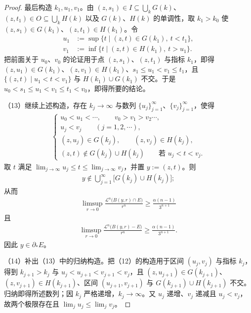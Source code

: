 \documentclass[../../main.tex]{subfiles}%
\begin{document}
\begin{proof}
最后构造 $k_1,u_1,v_1$。由 $(z,s_1)\in I\subseteq\bigcup_kG(k)$、$(z,t_1)\in O\subseteq\bigcup_kH(k)$ 以及 $G(k)$、$H(k)$ 的单调性，取 $k_1>k_0$ 使 $(z,s_1)\in G(k_1)$、$(z,t_1)\in H(k_1)$。令
\begin{align*}
u_1&:=\sup\{t\mid(z,t)\in G(k_1),\ t<t_1\},\\
v_1&:=\inf\{t\mid(z,t)\in H(k_1),\ t>u_1\}.
\end{align*}
把前面关于 $u_0$、$v_0$ 的论证用于点 $(z,s_1)$、$(z,t_1)$ 与指标 $k_1$，即得 $(z,u_1)\in G(k_1)$、$(z,v_1)\in H(k_1)$、$s_1\leqslant u_1<v_1\leqslant t_1$，且 $\{(z,t)\mid u_1<t<v_1\}$ 与 $H(k_1)\cup G(k_1)$ 不交。于是 $u_0<s_1\leqslant u_1<v_1\leqslant t_1<v_0$，即得所要的结论。

（13）继续上述构造，存在 $k_j\to\infty$ 与数列 $\{u_j\}_{j=1}^{\infty}$、$\{v_j\}_{j=1}^{\infty}$，使得
\begin{align*}
\begin{cases}
u_0<u_1<\cdots,\qquad v_0>v_1>v_2\cdots,\\[2pt]
u_j<v_j\qquad(j=1,2,\cdots),\\[2pt]
(z,u_j)\in G(k_j),\qquad(z,v_j)\in H(k_j),\\[2pt]
(z,t)\notin G(k_j)\cup H(k_j)\qquad\text{若 }u_j<t<v_j.
\end{cases}
\end{align*}
取 $t$ 满足 $\lim_{j\to\infty}u_j\leqslant t\leqslant\lim_{j\to\infty}v_j$，并置 $y:=(z,t)$。则
\begin{align*}
y\notin\bigcup_{j=1}^{\infty}\bigl[G(k_j)\cup H(k_j)\bigr];
\end{align*}
从而
\begin{align*}
\limsup_{r\to0}\frac{\mathcal{L}^n\bigl(B(y,r)\cap E\bigr)}{r^n}\geqslant\frac{\alpha(n-1)}{3^{n+1}}
\end{align*}
且
\begin{align*}
\limsup_{r\to0}\frac{\mathcal{L}^n\bigl(B(y,r)-E\bigr)}{r^n}\geqslant\frac{\alpha(n-1)}{3^{n+1}} .
\end{align*}
因此 $y\in\partial_*E$。

（14）补出（13）中的归纳构造。把（12）的构造用于区间 $(u_j,v_j)$ 与指标 $k_j$，得到 $k_{j+1}>k_j$ 与 $u_j<u_{j+1}<v_{j+1}<v_j$，且 $(z,u_{j+1})\in G(k_{j+1})$、$(z,v_{j+1})\in H(k_{j+1})$、区间 $(u_{j+1},v_{j+1})$ 与 $G(k_{j+1})\cup H(k_{j+1})$ 不交。归纳即得所述数列；因 $k_j$ 严格递增，$k_j\to\infty$。又 $u_j$ 递增、$v_j$ 递减且 $u_j<v_j$，故两个极限存在且 $\lim_ju_j\leqslant\lim_jv_j$。


\end{proof}
\end{document}
